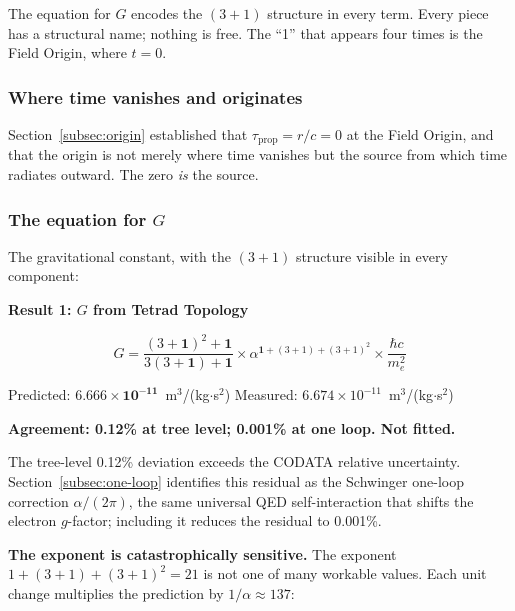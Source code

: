 \documentclass[aps,prd,preprint,superscriptaddress,showpacs,preprintnumbers,amsmath,amssymb,nofootinbib]{revtex4-2}
\begin{document}
The equation for $G$ encodes the $(3{+}1)$ structure in every term. Every piece has a structural name; nothing is free. The ``1'' that appears four times is the Field Origin, where $t = 0$.

\subsubsection*{Where time vanishes and originates}

Section~\ref{subsec:origin} established that $\tau_{\text{prop}} = r/c = 0$ at the Field Origin, and that the origin is not merely where time vanishes but the source from which time radiates outward. The zero \emph{is} the source.

\subsubsection*{The equation for $G$}

The gravitational constant, with the $(3{+}1)$ structure visible in every component:

\vspace{1.5em}
\noindent
\colorbox{resultgreen}{\parbox{\dimexpr\textwidth-2\fboxsep\relax}{%
\vspace{0.8em}
\centering
\textbf{\large Result 1: $G$ from Tetrad Topology}

\vspace{0.5em}
\boldmath
\begin{equation}
G = \frac{(3+\mathbf{1})^2 + \mathbf{1}}{3(3+\mathbf{1}) + \mathbf{1}} \times \alpha^{\mathbf{1}+(3+1)+(3+1)^2} \times \frac{\hbar c}{m_e^2}
\label{eq:master}
\end{equation}
\unboldmath

\vspace{0.3em}
Predicted: $\bm{6.666 \times 10^{-11}}$~m$^3$/(kg$\cdot$s$^2$) \quad Measured: $6.674 \times 10^{-11}$~m$^3$/(kg$\cdot$s$^2$)

\textbf{Agreement: 0.12\% at tree level; 0.001\% at one loop. Not fitted.}
\vspace{0.5em}
}}
\vspace{1cm}

The tree-level 0.12\% deviation exceeds the CODATA relative uncertainty. Section~\ref{subsec:one-loop} identifies this residual as the Schwinger one-loop correction $\alpha/(2\pi)$, the same universal QED self-interaction that shifts the electron $g$-factor; including it reduces the residual to 0.001\%.

\textbf{The exponent is catastrophically sensitive.} The exponent $1 + (3{+}1) + (3{+}1)^2 = 21$ is not one of many workable values. Each unit change multiplies the prediction by $1/\alpha \approx 137$:
\end{document}
